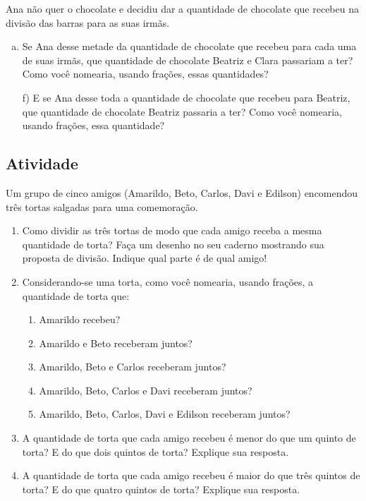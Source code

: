Ana não quer o chocolate e decidiu dar a quantidade de chocolate que recebeu na divisão das barras para as suas irmãs.

\begin{enumerate}[e)]
\item Se Ana desse metade da quantidade de chocolate que recebeu para cada uma de suas irmãs, que quantidade de chocolate Beatriz e Clara passariam a ter? Como você nomearia, usando frações, essas quantidades?  
\item[f)] E se Ana desse toda a quantidade de chocolate que recebeu para Beatriz, que quantidade de chocolate  Beatriz passaria a ter? Como você nomearia, usando frações, essa quantidade?
\end{enumerate} %


\subsection{Atividade}

Um grupo de cinco amigos (Amarildo, Beto, Carlos, Davi e Edilson) encomendou três tortas salgadas para uma comemoração.

\begin{center}
  
\end{center}
 
\begin{enumerate} [\quad a)] %
  \item     Como dividir as três tortas de modo que cada amigo receba a mesma quantidade de torta? Faça um desenho no seu caderno mostrando sua proposta de divisão. Indique qual parte é de qual amigo!
  \item     Considerando-se uma torta, como você nomearia, usando frações, a quantidade de torta que:     
\begin{enumerate} [\quad I)] %
      \item         Amarildo recebeu? 
      \item         Amarildo e Beto receberam juntos? 
      \item         Amarildo, Beto e Carlos receberam juntos? 
      \item         Amarildo, Beto, Carlos e Davi receberam juntos?
      \item         Amarildo, Beto, Carlos, Davi e Edilson receberam juntos?
\end{enumerate} %

  \item     A quantidade de torta que cada amigo recebeu é menor do que um quinto de torta? E do que dois quintos de torta? Explique sua resposta.
  \item     A quantidade de torta que cada amigo recebeu é maior do que três quintos de torta? E do que quatro quintos de torta? Explique sua resposta.
\end{enumerate} %


